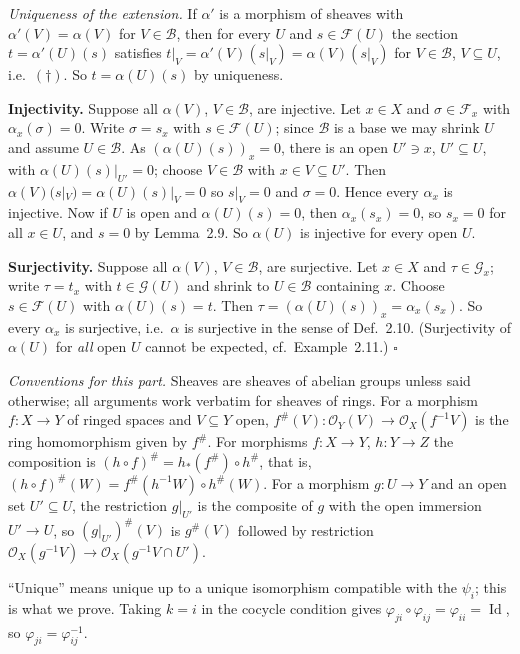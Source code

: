 \documentclass[11pt]{article}
\begin{document}
\emph{Uniqueness of the extension.} If $\alpha'$ is a morphism of sheaves with $\alpha'(V)=\alpha(V)$ for $V\in\mathcal B$, then for every $U$ and $s\in\mathcal F(U)$ the section $t=\alpha'(U)(s)$ satisfies $t|_V=\alpha'(V)(s|_V)=\alpha(V)(s|_V)$ for $V\in\mathcal B$, $V\subseteq U$, i.e.\ $(\dagger)$. So $t=\alpha(U)(s)$ by uniqueness.

\textbf{Injectivity.} Suppose all $\alpha(V)$, $V\in\mathcal B$, are injective. Let $x\in X$ and $\sigma\in\mathcal F_x$ with $\alpha_x(\sigma)=0$. Write $\sigma=s_x$ with $s\in\mathcal F(U)$; since $\mathcal B$ is a base we may shrink $U$ and assume $U\in\mathcal B$. As $(\alpha(U)(s))_x=0$, there is an open $U'\ni x$, $U'\subseteq U$, with $\alpha(U)(s)|_{U'}=0$; choose $V\in\mathcal B$ with $x\in V\subseteq U'$. Then $\alpha(V)(s|_V)=\alpha(U)(s)|_V=0$ so $s|_V=0$ and $\sigma=0$. Hence every $\alpha_x$ is injective. Now if $U$ is open and $\alpha(U)(s)=0$, then $\alpha_x(s_x)=0$, so $s_x=0$ for all $x\in U$, and $s=0$ by Lemma~2.9. So $\alpha(U)$ is injective for every open $U$.

\textbf{Surjectivity.} Suppose all $\alpha(V)$, $V\in\mathcal B$, are surjective. Let $x\in X$ and $\tau\in\mathcal G_x$; write $\tau=t_x$ with $t\in\mathcal G(U)$ and shrink to $U\in\mathcal B$ containing $x$. Choose $s\in\mathcal F(U)$ with $\alpha(U)(s)=t$. Then $\tau=(\alpha(U)(s))_x=\alpha_x(s_x)$. So every $\alpha_x$ is surjective, i.e.\ $\alpha$ is surjective in the sense of Def.~2.10. (Surjectivity of $\alpha(U)$ for \emph{all} open $U$ cannot be expected, cf.\ Example~2.11.) \hfill$\square$

\emph{Conventions for this part.} Sheaves are sheaves of abelian groups unless said otherwise; all arguments work verbatim for sheaves of rings. For a morphism $f:X\to Y$ of ringed spaces and $V\subseteq Y$ open, $f^\#(V):\mathcal{O}_Y(V)\to\mathcal{O}_X(f^{-1}V)$ is the ring homomorphism given by $f^\#$. For morphisms $f:X\to Y$, $h:Y\to Z$ the composition is $(h\circ f)^\#=h_*(f^\#)\circ h^\#$, that is, $(h\circ f)^\#(W)=f^\#(h^{-1}W)\circ h^\#(W)$. For a morphism $g:U\to Y$ and an open set $U'\subseteq U$, the restriction $g|_{U'}$ is the composite of $g$ with the open immersion $U'\to U$, so $(g|_{U'})^\#(V)$ is $g^\#(V)$ followed by restriction $\mathcal{O}_X(g^{-1}V)\to\mathcal{O}_X(g^{-1}V\cap U')$.

\pf
``Unique'' means unique up to a unique isomorphism compatible with the $\psi_i$; this is what we prove. Taking $k=i$ in the cocycle condition gives $\varphi_{ji}\circ\varphi_{ij}=\varphi_{ii}=\operatorname{Id}$, so $\varphi_{ji}=\varphi_{ij}^{-1}$.
\end{document}
